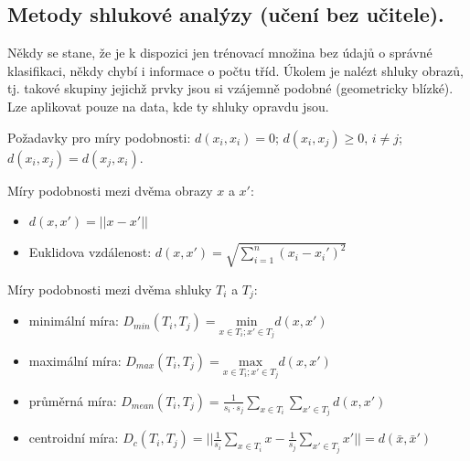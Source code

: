 \subsection{Metody shlukové analýzy (učení bez učitele).}
Někdy se stane, že je k dispozici jen trénovací množina bez údajů o správné klasifikaci, někdy chybí i informace o počtu tříd. Úkolem je nalézt shluky obrazů, tj. takové skupiny jejichž prvky jsou si vzájemně podobné (geometricky blízké). Lze aplikovat pouze na data, kde ty shluky opravdu jsou.

Požadavky pro míry podobnosti: $ d(x_i, x_i) = 0 $; $ d(x_i, x_j) \geq 0, \, i \neq j $; $ d(x_i, x_j) = d(x_j, x_i) $.

Míry podobnosti mezi dvěma obrazy $ x $ a $ x' $:
\begin{itemize}
\item $ d(x, x') = || x-x' || $
\item Euklidova vzdálenost: $ d(x, x') = \sqrt{\displaystyle{\sum_{i=1}^n}(x_i - x_i')^2} $
\end{itemize}

Míry podobnosti mezi dvěma shluky $ T_i $ a $ T_j $:
\begin{itemize}
\item minimální míra: $ D_{min}(T_i, T_j) = \underset{x \in T_i; x' \in T_j}{\mathrm{min}} d(x, x') $
\item maximální míra: $ D_{max}(T_i, T_j) = \underset{x \in T_i; x' \in T_j}{\mathrm{max}} d(x, x') $
\item průměrná míra: $ D_{mean}(T_i, T_j) = \frac{1}{s_i \cdot s_j} \displaystyle{\sum_{x \in T_i} \sum_{x' \in T_j}} d(x, x') $
\item centroidní míra: $ D_{c}(T_i, T_j) = || \frac{1}{s_i} \displaystyle{\sum_{x \in T_i} x} - \frac{1}{s_j} \displaystyle{\sum_{x' \in T_j} x'} || = d(\bar{x}, \bar{x}')$
\end{itemize}

